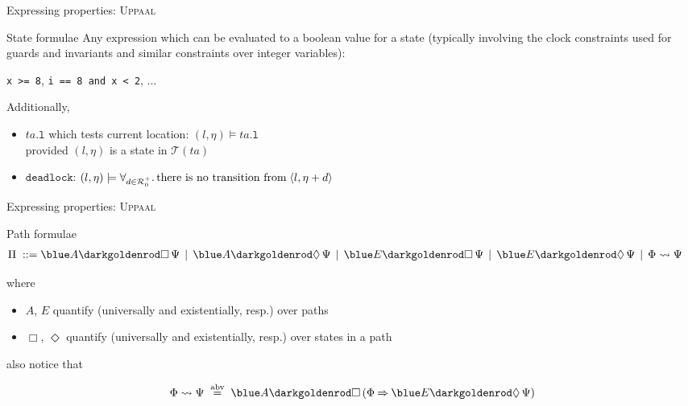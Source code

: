 \documentclass{beamer}
\def\dgold#1{{\darkgoldenrod #1}}
\def\dkb#1{{\blue #1}}
\def\R{\mathcal{R}}
\def\TL#1{\mathcal{T}(#1)}
\begin{document}
\begin{slide}{Expressing properties: \textsc{Uppaal}}
\small

\begin{block}{State formulae}
Any expression which can be evaluated to a boolean value for a state (typically involving the 
\dgold{clock constraints} used for guards and invariants and similar constraints over integer variables):
\begin{center}
\texttt{x >= 8}, \texttt{i == 8 and x < 2}, ...
\end{center}
Additionally,
\begin{itemize}
\item $ta.\texttt{l}$ which tests \dgold{current location}:  $(l, \eta) \models ta.\texttt{l}$ \\
provided $(l, \eta)$ is a state in $\TL{ta}$
\item $\texttt{deadlock}$: $(l, \eta) \models \forall_{d \in \R_0^+} .\, \text{there is no transition from} \; \pair{l,\eta+d}$ 
\end{itemize}
\end{block}

\end{slide}

\begin{slide}{Expressing properties: \textsc{Uppaal}}
\small

\newcommand{\Boxc}{\dgold{\Box}}
\newcommand{\Diamondc}{\dgold{\Diamond}}
\newcommand{\Ac}{\dkb{A}}
\newcommand{\Ec}{\dkb{E}}

\begin{block}{Path formulae}
\begin{align*}
\Pi\; ::=\; & \Ac \Boxc\, \Psi\, \mid\, \Ac\Diamondc\, \Psi\, \mid\, \Ec \Boxc\, \Psi\, \mid\, \Ec \Diamondc\, \Psi\, \mid\, \Phi \leadsto  \Psi\
\end{align*}

where
\begin{itemize}
\item \dkb{$A$, $E$} quantify (universally and existentially, resp.) over \dkb{paths}
\item \dgold{$\Box$, $\Diamond$} quantify (universally and existentially, resp.) over \dgold{states in a path}
\end{itemize}
also notice that

\begin{align*}
 \Phi \leadsto  \Psi\; \abv\; \Ac \Boxc\, (\Phi \imp \Ec \Diamondc\, \Psi)
\end{align*}
\end{block}

\end{slide}
\end{document}
